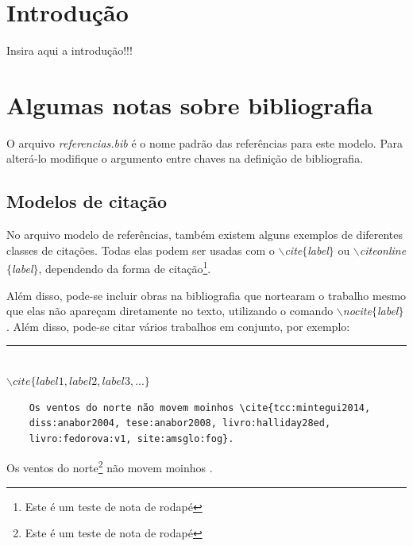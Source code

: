 \chapter{Introdução}
\par Insira aqui a introdução!!!

\lipsum[1-5]



\chapter{Algumas notas sobre bibliografia}


\par O arquivo \textit{referencias.bib} é o nome padrão das referências para este modelo. Para alterá-lo modifique o argumento entre chaves na definição de bibliografia.


   \section{Modelos de citação}
      \par No arquivo modelo de referências, também existem alguns exemplos de diferentes classes de citações. Todas elas podem ser usadas com o \textit{$\backslash$cite$\{$label$\}$} ou \textit{$\backslash$citeonline$\{$label$\}$}, dependendo da forma de citação\footnote{Este é um teste de nota de rodapé}.

	\par Além disso, pode-se incluir obras na bibliografia que nortearam o trabalho mesmo que elas não apareçam diretamente no texto, utilizando o comando \textit{$\backslash$nocite$\{$label$\}$}. Além disso, pode-se citar vários trabalhos em conjunto, por exemplo:
	
	\begin{center}\rule{0.5\textwidth}{1pt}\\$\backslash cite\{label1,label2,label3,...\}$\end{center}

	\begin{verbatim}
	Os ventos do norte não movem moinhos \cite{tcc:mintegui2014, 
	diss:anabor2004, tese:anabor2008, livro:halliday28ed, 
	livro:fedorova:v1, site:amsglo:fog}.
	\end{verbatim}
	    
	\par Os ventos do norte\footnote{Este é um teste de nota de rodapé} não movem moinhos \cite{tcc:mintegui2014,diss:anabor2004,tese:anabor2008,livro:halliday28ed,livro:fedorova:v1,site:amsglo:fog}.
        
